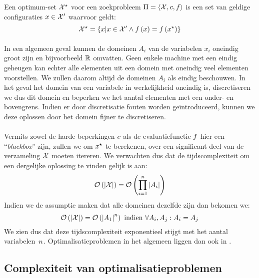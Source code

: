 \begin{definition}
Een optimum-set $\mathcal{X}^{\star}$ voor een zoekprobleem $\Pi=\left\langle \mathcal{X},c,f\right\rangle$ is een set van geldige configuraties $x\in\mathcal{X}'$ waarvoor geldt:
\begin{equation}
\mathcal{X}^{\star}=\left\{ x|x\in\mathcal{X}'\wedge f\left(x\right)=f\left(x^{\star}\right)\right\}
\end{equation}
\end{definition}

\paragraph{}
In een algemeen geval kunnen de domeinen $A_i$ van de variabelen $x_i$ oneindig groot zijn en bijvoorbeeld $\mathbb{R}$ omvatten. Geen enkele machine met een eindig geheugen kan echter alle elementen uit een domein met oneindig veel elementen voorstellen. We zullen daarom altijd de domeinen $A_i$ als eindig beschouwen. In het geval het domein van een variabele in werkelijkheid oneindig is, discretiseren we dus dit domein en beperken we het aantal elementen met een onder- en bovengrens. Indien er door discretisatie fouten worden ge\"introduceerd, kunnen we deze oplossen door het domein fijner te discretiseren.
\paragraph{}
Vermits zowel de harde beperkingen $c$ als de evaluatiefunctie $f$ hier een ``\emph{blackbox}'' zijn, zullen we om $x^{\star}$ te berekenen, over een significant deel van de verzameling $\mathcal{X}$ moeten itereren. We verwachten dus dat de tijdscomplexiteit om een dergelijke oplossing te vinden gelijk is aan:
\begin{equation}
\mathcal{O}\left(\left| \mathcal{X}\right|\right)=\mathcal{O}\left(\displaystyle\prod_{i=1}^n\left| A_i\right|\right)
\end{equation}
Indien we de assumptie maken dat alle domeinen dezelfde zijn dan bekomen we:
\begin{equation}
\mathcal{O}\left(\left| \mathcal{X}\right|\right)=\mathcal{O}\left(\left| A_1\right|^n\right)\mbox{ indien }\forall A_i,A_j: A_i=A_j
\end{equation}
We zien dus dat deze tijdscomplexiteit exponentieel stijgt met het aantal variabelen~$n$. Optimalisatieproblemen in het algemeen liggen dan ook in .

\subsection{Complexiteit van optimalisatieproblemen}

